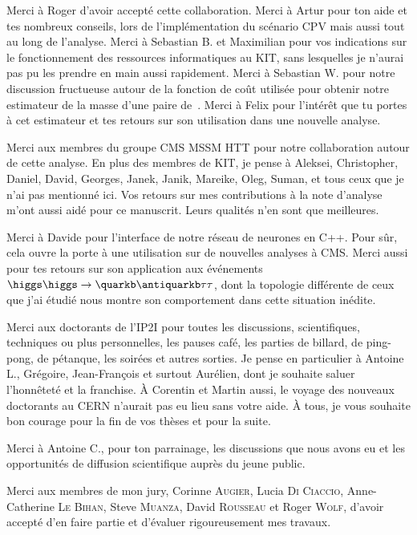 Merci à Roger d'avoir accepté cette collaboration.
Merci à Artur pour ton aide et tes nombreux conseils, lors de l'implémentation du scénario CPV mais aussi tout au long de l'analyse.
Merci à Sebastian B. et Maximilian pour vos indications sur le fonctionnement des ressources informatiques au KIT,
sans lesquelles je n'aurai pas pu les prendre en main aussi rapidement.
Merci à Sebastian W. pour notre discussion fructueuse autour de la fonction de coût utilisée pour obtenir notre estimateur de la masse d'une paire de~\tau.
Merci à Felix pour l'intérêt que tu portes à cet estimateur et tes retours sur son utilisation dans une nouvelle analyse.
\par
Merci aux membres du groupe CMS MSSM HTT pour notre collaboration autour de cette analyse.
En plus des membres de KIT,
je pense à
Aleksei,
Christopher,
Daniel,
David,
Georges,
Janek,
Janik,
Mareike,
Oleg,
Suman,
et tous ceux que je n'ai pas mentionné ici.
Vos retours sur mes contributions à la note d'analyse m'ont aussi aidé pour ce manuscrit.
Leurs qualités n'en sont que meilleures.
\par
Merci à Davide pour l'interface de notre réseau de neurones en C++.
Pour sûr, cela ouvre la porte à une utilisation sur de nouvelles analyses à CMS.
Merci aussi pour tes retours sur son application aux événements $\higgs\higgs\to\quarkb\antiquarkb\tau\tau$,
dont la topologie différente de ceux que j'ai étudié nous montre son comportement dans cette situation inédite.
\par
Merci aux doctorants de l'IP2I pour
toutes les discussions, scientifiques, techniques ou plus personnelles,
les pauses café,
les parties de billard, de ping-pong, de pétanque,
les soirées et autres sorties.
Je pense en particulier à
Antoine L., Grégoire, Jean-François
et surtout Aurélien,
dont je souhaite saluer l'honnêteté et la franchise.
À Corentin et Martin aussi,
le voyage des nouveaux doctorants au CERN n'aurait pas eu lieu sans votre aide.
À tous, je vous souhaite bon courage pour la fin de vos thèses et pour la suite.
\par
Merci à Antoine C., pour ton parrainage, les discussions que nous avons eu
et les opportunités de diffusion scientifique auprès du jeune public.
\par
Merci aux membres de mon jury,
Corinne \textsc{Augier},
Lucia \textsc{Di Ciaccio},
Anne-Catherine \textsc{Le Bihan},
Steve \textsc{Muanza},
David \textsc{Rousseau} et
Roger \textsc{Wolf},
d'avoir accepté d'en faire partie et d'évaluer rigoureusement mes travaux.
